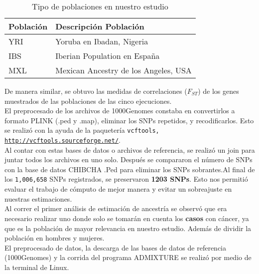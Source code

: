 \begin{table}[H]
  \centering
  \begin{tabular}{|l|l|}
    \hline
    Poblaci\'on& Descripci\'on Poblaci\'on\\
    \hline
    YRI&Yoruba en Ibadan, Nigeria\\
    IBS&Iberian Population en España\\
    MXL&Mexican Ancestry de los Angeles, USA\\
    \hline
    
  \end{tabular}
  \caption{Tipo de poblaciones en nuestro estudio}
  \label{table:pob}
\end{table}

De manera similar, se obtuvo las medidas de correlaciones ($F_{ST}$) de los genes muestrados de las poblaciones de las cinco ejecuciones.\\

El preprocesado de los archivos de 1000Genomes constaba en convertirlos a formato PLINK (.ped y .map), eliminar los SNPs repetidos, y recodificarlos. Esto se realiz\'o con la ayuda de la paqueter\'ia \texttt{vcftools, \url{http://vcftools.sourceforge.net/}}.\\

Al contar con estas bases de datos o archivos de referencia, se realiz\'o un join para juntar todos los archivos en uno solo. Despu\'es se compararon el n\'umero de SNPs con la base de datos CHIBCHA .Ped para eliminar los SNPs sobrantes.Al final de los \texttt{1,006,658} SNPs registrados, se preservaron \textbf{1203 SNPs}. Esto nos permiti\'o evaluar el trabajo de c\'omputo de mejor manera y evitar un sobreajuste en nuestras estimaciones.\\

Al correr el primer an\'alisis de estimaci\'on de ancestr\'ia se observ\'o que era necesario realizar uno donde solo se tomar\'an en cuenta los \textbf{casos} con c\'ancer, ya que es la poblaci\'on de mayor relevancia en nuestro estudio. Adem\'as de dividir la poblaci\'on en hombres y mujeres.\\

El preprocesado de datos, la descarga de las bases de datos de referencia (1000Genomes) y la corrida del programa ADMIXTURE se realiz\'o por medio de la terminal de Linux. \\







